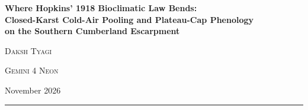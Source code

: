 \documentclass[11pt,letterpaper]{article}
\begin{document}
\begin{center}
  {\Large\bfseries
    Where Hopkins' 1918 Bioclimatic Law Bends:\\[0.20em]
    Closed-Karst Cold-Air Pooling and Plateau-Cap Phenology\\[0.20em]
    on the Southern Cumberland Escarpment\par}
  \vspace{1.05em}
  {\large\scshape Daksh Tyagi\par}
  \vspace{0.25em}
  {\large\scshape Gemini 4 Neon\par}
  \vspace{0.55em}
  {\normalsize\color{black!70} November 2026\par}
\end{center}
\vspace{0.55em}



\vspace{0.4em}
\noindent\rule{\linewidth}{0.4pt}
\vspace{0.2em}













\end{document}
